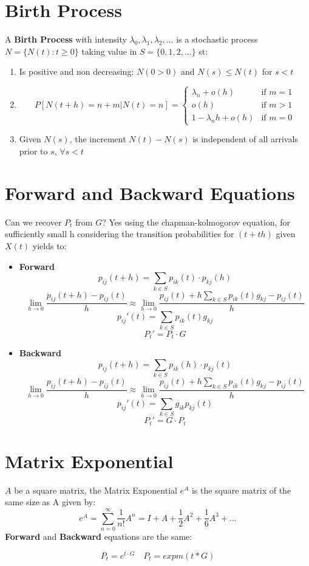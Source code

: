 \section{Birth Process}
A \textbf{Birth Process} with intensity $\lambda_0, \lambda_1, \lambda_2, ...$ is a stochastic process $N = \{N(t): t \geq 0\}$ taking value in $S = \{0,1,2,...\}$ st:
\begin{enumerate}
    \item Is positive and non decreasing: $N(0 > 0)$ and $N(s) \leq N(t)$ for $s < t$
    \item $$
    P[N(t+h) = n+m | N(t) = n] = \begin{cases}
        \lambda_n + o(h) & \mbox{if } m = 1\\
        o(h) & \mbox{if } m > 1\\
        1- \lambda_n h + o(h) & \mbox{if } m = 0
    \end{cases}
    $$
    \item Given $N(s)$, the increment $N(t) - N(s)$ is independent of all arrivals prior to $s$, $\forall s < t$
\end{enumerate}
\section{Forward and Backward Equations}
Can we recover $P_t$ from $G$? Yes using the chapman-kolmogorov equation, for sufficiently small h considering the transition probabilities for $(t +t h)$ given $X(t)$ yields to:
\begin{itemize}
    \item \textbf{Forward}
    $$p_{ij}(t + h) = \sum_{k \in S} p_{ik}(t) \cdot p_{kj}(h)$$
    $$\lim_{h \rightarrow 0} \frac{p_{ij}(t + h) - p_{ij}(t)}{h} \approx \lim_{h \rightarrow 0}\frac{p_{ij}(t) + h\sum_{k \in S}p_{ik}(t)g_{kj} - p_{ij}(t)}{h}$$
    $$p_{ij}'(t) = \sum_{k \in S}p_{ik}(t)g_{kj}$$
    $$P_t' = P_t \cdot G$$

    \item \textbf{Backward}
    $$p_{ij}(t + h) = \sum_{k \in S} p_{ik}(h) \cdot p_{kj}(t)$$
    $$\lim_{h \rightarrow 0} \frac{p_{ij}(t + h) - p_{ij}(t)}{h} \approx \lim_{h \rightarrow 0}\frac{p_{ij}(t) + h\sum_{k \in S}p_{ik}(t)g_{kj} - p_{ij}(t)}{h}$$
    $$p_{ij}'(t) = \sum_{k \in S}g_{ik}p_{kj}(t)$$
    $$P_t' = G \cdot P_t$$
\end{itemize}

\section{Matrix Exponential}
$A$ be a square matrix, the Matrix Exponential $e^A$ is the square matrix of the same size as A given by:
$$e^A = \sum_{n = 0}^\infty \frac{1}{n!}A^n = I + A + \frac{1}{2}A^2 + \frac{1}{6}A^3 + \hdots$$
\textbf{Forward} and \textbf{Backward} equations are the same:
\begin{tcolorbox}
$$P_t = e^{t \cdot G} \quad P_t = expm(t*G)$$    
\end{tcolorbox}

